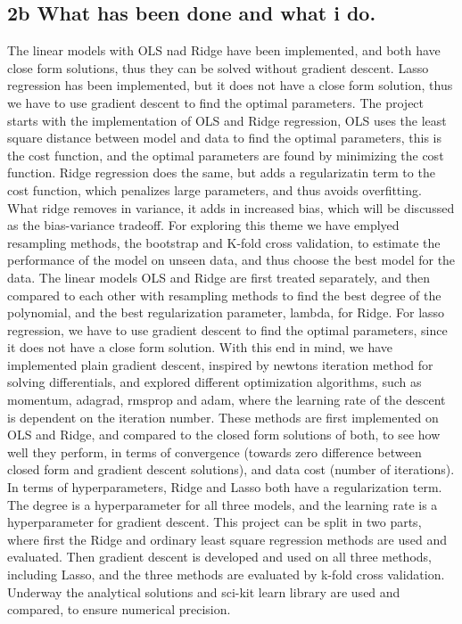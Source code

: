 \documentclass[aps,rmp,reprint,raggedbottom,amsmath,amssymb,longbibliography]{revtex4-1}
\begin{document}
\subsection{2b What has been done and what i do.}
The linear models with OLS nad Ridge have been implemented, and both have close form solutions, thus they can be solved without gradient descent.
Lasso regression has been implemented, but it does not have a close form solution, thus we have to use gradient descent to find the optimal parameters.
The project starts with the implementation of OLS and Ridge regression, OLS uses the least square distance between model and data to find the optimal parameters, this is the cost function, and the optimal parameters are found by minimizing the cost function.
Ridge regression does the same, but adds a regularizatin term to the cost function, which penalizes large parameters, and thus avoids overfitting.
What ridge removes in variance, it adds in increased bias, which will be discussed as the bias-variance tradeoff. For exploring this theme we have
emplyed resampling methods, the bootstrap and K-fold cross validation, to estimate the performance of the model on unseen data, and thus choose the best model for the data.
The linear models OLS and Ridge are first treated separately, and then compared to each other with resampling methods to find the best degree of the polynomial, and the best regularization parameter, lambda, for Ridge.
For lasso regression, we have to use gradient descent to find the optimal parameters, since it does not have a close form solution.
With this end in mind, we have implemented plain gradient descent, inspired by newtons iteration method for solving differentials, and explored different optimization algorithms,
such as momentum, adagrad, rmsprop and adam, where the learning rate of the descent is dependent on the iteration number. These methods are first
implemented on OLS and Ridge, and compared to the closed form solutions of both, to see how well they perform, in terms of convergence (towards zero difference between closed form and gradient descent solutions), and data cost (number of iterations).
In terms of hyperparameters, Ridge and Lasso both have a regularization term.
The degree is a hyperparameter for all three models, and the learning rate is a hyperparameter for gradient descent.
This project can be split in two parts, where first the Ridge and ordinary least square regression methods
are used and evaluated. Then gradient descent is developed and used on all three methods, including Lasso,
and the three methods are evaluated by k-fold cross validation. Underway the analytical solutions
and sci-kit learn library are used and compared, to ensure numerical precision. 
\end{document}
